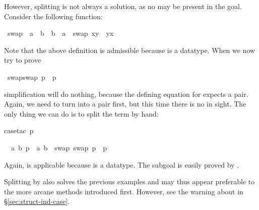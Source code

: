\begin{isabellebody}
\begin{isamarkuptxt}
However, splitting  is not always a solution, as no 
may be present in the goal. Consider the following function:%
\end{isamarkuptxt}%
\isamarkuptrue%
%
\endisatagproof
{\isafoldproof}%
%
\isadelimproof
%
\endisadelimproof
{}\isamarkupfalse%
\ swap\ {\isacharcolon}{\isacharcolon}\ {\isachardoublequoteopen}{\isacharprime}a\ {\isasymtimes}\ {\isacharprime}b\ {\isasymRightarrow}\ {\isacharprime}b\ {\isasymtimes}\ {\isacharprime}a{\isachardoublequoteclose}\ \ {\isachardoublequoteopen}swap\ {\isacharparenleft}x{\isacharcomma}y{\isacharparenright}\ {\isacharequal}\ {\isacharparenleft}y{\isacharcomma}x{\isacharparenright}{\isachardoublequoteclose}%
\begin{isamarkuptext}%
\noindent
Note that the above  definition is admissible
because \isa{{\isasymtimes}} is a datatype. When we now try to prove%
\end{isamarkuptext}%
\isamarkuptrue%
\isamarkupfalse%
\ {\isachardoublequoteopen}swap{\isacharparenleft}swap\ p{\isacharparenright}\ {\isacharequal}\ p{\isachardoublequoteclose}%
\isadelimproof
%
\endisadelimproof
%
\isatagproof
%
\begin{isamarkuptxt}%
\noindent
simplification will do nothing, because the defining equation for
 expects a pair. Again, we need to turn 
into a pair first, but this time there is no  in sight.
The only thing we can do is to split the term by hand:%
\end{isamarkuptxt}%
\isamarkuptrue%
\isamarkupfalse%
{\isacharparenleft}case{\isacharunderscore}tac\ p{\isacharparenright}%
\begin{isamarkuptxt}%
\noindent
\begin{isabelle}%
\ {}{\isachardot}\ {\isasymAnd}a\ b{\isachardot}\ p\ {\isacharequal}\ {\isacharparenleft}a{\isacharcomma}\ b{\isacharparenright}\ {\isasymLongrightarrow}\ swap\ {\isacharparenleft}swap\ p{\isacharparenright}\ {\isacharequal}\ p%
\end{isabelle}
Again,  is applicable because \isa{{\isasymtimes}} is a datatype.
The subgoal is easily proved by .

Splitting by  also solves the previous examples and may thus
appear preferable to the more arcane methods introduced first. However, see
the warning about  in \S\ref{sec:struct-ind-case}.


\end{isamarkuptxt}
\end{isabellebody}
